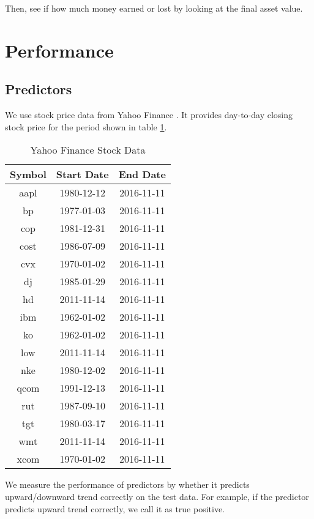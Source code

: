 \documentclass[twocolumn,10pt]{asme2ej}
\begin{document}
Then, see if how much money earned or lost by looking at the final
asset value.


\section{Performance}

\subsection{Predictors}

We use stock price data from Yahoo Finance
\cite{web:yahoo_finance}. It provides day-to-day closing stock price
for the period shown in table \ref{yahooStockData}.

\begin{table}
  \begin{tabular}{ccc}
    Symbol & Start Date & End Date \\
    \hline
    aapl & 1980-12-12 & 2016-11-11 \\
    bp & 1977-01-03 & 2016-11-11 \\
    cop & 1981-12-31 & 2016-11-11 \\
    cost & 1986-07-09 & 2016-11-11 \\
    cvx & 1970-01-02 & 2016-11-11 \\
    dj & 1985-01-29 & 2016-11-11 \\
    hd & 2011-11-14 & 2016-11-11 \\
    ibm & 1962-01-02 & 2016-11-11 \\
    ko & 1962-01-02 & 2016-11-11 \\
    low & 2011-11-14 & 2016-11-11 \\
    nke & 1980-12-02 & 2016-11-11 \\
    qcom & 1991-12-13 & 2016-11-11 \\
    rut & 1987-09-10 & 2016-11-11 \\
    tgt & 1980-03-17 & 2016-11-11 \\
    wmt & 2011-11-14 & 2016-11-11 \\
    xcom & 1970-01-02 & 2016-11-11 \\
  \end{tabular}
  \caption{Yahoo Finance Stock Data}
  \label{yahooStockData}
\end{table}


We measure the performance of predictors by whether it predicts
upward/downward trend correctly on the test data. For example, if the
predictor predicts upward trend correctly, we call it as true
positive. 
\end{document}
